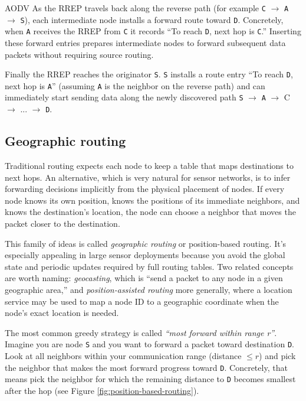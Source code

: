 \begin{Example}{AODV}{}
As the RREP travels back along the reverse path (for example \texttt{C} $\to$ \texttt{A} $\to$ \texttt{S}), each intermediate node installs a forward route toward \texttt{D}. Concretely, when \texttt{A} receives the RREP from \texttt{C} it records “To reach \texttt{D}, next hop is \texttt{C}.” Inserting these forward entries prepares intermediate nodes to forward subsequent data packets without requiring source routing.

Finally the RREP reaches the originator \texttt{S}. \texttt{S} installs a route entry “To reach \texttt{D}, next hop is \texttt{A}” (assuming \texttt{A} is the neighbor on the reverse path) and can immediately start sending data along the newly discovered path \texttt{S} $\to$ \texttt{A} $\to$ C $\to$ ... $\to$ \texttt{D}.
\end{Example}


\subsection{Geographic routing}
Traditional routing expects each node to keep a table that maps destinations to next hops. An alternative, which is very natural for sensor networks, is to infer forwarding decisions implicitly from the physical placement of nodes. If every node knows its own position, knows the positions of its immediate neighbors, and knows the destination’s location, the node can choose a neighbor that moves the packet closer to the destination.

This family of ideas is called \textit{geographic routing} or position-based routing. It’s especially appealing in large sensor deployments because you avoid the global state and periodic updates required by full routing tables. Two related concepts are worth naming: \textit{geocasting}, which is “send a packet to any node in a given geographic area,” and \textit{position-assisted routing} more generally, where a location service may be used to map a node ID to a geographic coordinate when the node’s exact location is needed.

The most common greedy strategy is called \textit{“most forward within range r”}. Imagine you are node \texttt{S} and you want to forward a packet toward destination \texttt{D}. Look at all neighbors within your communication range (distance $\leq r$) and pick the neighbor that makes the most forward progress toward \texttt{D}. Concretely, that means pick the neighbor for which the remaining distance to \texttt{D} becomes smallest after the hop (see Figure \ref{fig:position-based-routing}).

